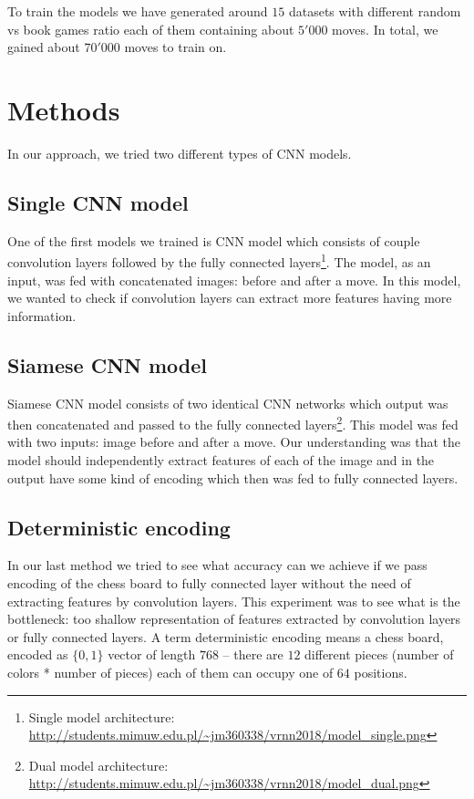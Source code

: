 \documentclass[10pt,twocolumn,letterpaper]{article}
\begin{document}
To train the models we have generated around $15$ datasets with different random
vs book games ratio each of them containing about $5'000$ moves. In total, we
gained about $70'000$ moves to train on.

\section{Methods}

In our approach, we tried two different types of CNN models.

\subsection{Single CNN model}

One of the first models we trained is CNN model which consists of couple
convolution layers followed by the fully connected layers\footnote{Single model
architecture:
\url{http://students.mimuw.edu.pl/~jm360338/vrnn2018/model_single.png}}. The
model, as an input, was fed with concatenated images: before and after a move.
In this model, we wanted to check if convolution layers can extract more features
having more information.

\subsection{Siamese CNN model}

Siamese CNN model consists of two identical CNN networks which output was then
concatenated and passed to the fully connected layers\footnote{Dual model
architecture:
\url{http://students.mimuw.edu.pl/~jm360338/vrnn2018/model_dual.png}}. This
model was fed with two inputs: image before and after a move. Our understanding
was that the model should independently extract features of each of the image
and in the output have some kind of encoding which then was fed to fully
connected layers.

\subsection{Deterministic encoding}

In our last method we tried to see what accuracy can we achieve if we pass
encoding of the chess board to fully connected layer without the need of extracting
features by convolution layers. This experiment was to see what is the
bottleneck: too shallow representation of features extracted by convolution
layers or fully connected layers. A term deterministic encoding means a chess
board, encoded as $\{0,1\}$ vector of length $768$ -- there are $12$ different
pieces (number of colors * number of pieces) each of them can occupy one of $64$
positions.
\end{document}

